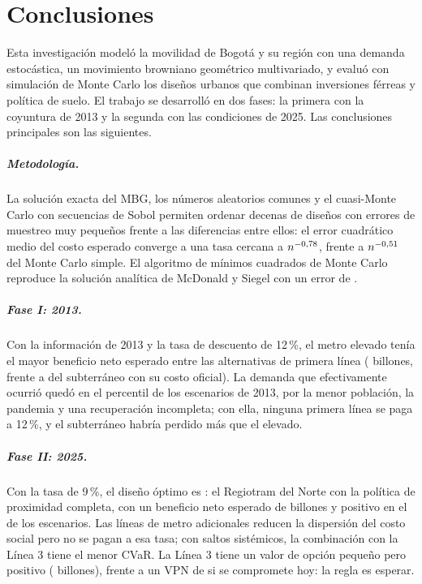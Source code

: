 \chapter{Conclusiones}\label{cap:conclusiones}

Esta investigación modeló la movilidad de Bogotá y su región con una demanda estocástica, un movimiento
browniano geométrico multivariado, y evaluó con simulación de Monte Carlo los diseños urbanos que
combinan inversiones férreas y política de suelo. El trabajo se desarrolló en dos fases: la primera con
la coyuntura de 2013 y la segunda con las condiciones de 2025. Las conclusiones principales son las
siguientes.

\paragraph{Metodología.} La solución exacta del MBG, los números aleatorios comunes y el cuasi-Monte
Carlo con secuencias de Sobol permiten ordenar decenas de diseños con errores de muestreo muy pequeños
frente a las diferencias entre ellos: el error cuadrático medio del costo esperado converge a una tasa
cercana a $n^{-0,78}$, frente a $n^{-0,51}$ del Monte Carlo simple. El algoritmo de
mínimos cuadrados de Monte Carlo reproduce la solución analítica de McDonald y Siegel con un error de
\MSError.

\paragraph{Fase I: 2013.} Con la información de 2013 y la tasa de descuento de 12\,\%, el metro elevado
tenía el mayor beneficio neto esperado entre las alternativas de primera línea (\BNElevDoce{} billones,
frente a \BNSubOfDoce{} del subterráneo con su costo oficial). La demanda que efectivamente ocurrió
quedó en el percentil \PercentilObsFin{} de los escenarios de 2013, por la menor población, la
pandemia y una recuperación incompleta; con ella, ninguna primera línea se paga a 12\,\%, y el
subterráneo habría perdido más que el elevado.

\paragraph{Fase II: 2025.} Con la tasa de 9\,\%, el diseño óptimo es \OptimoNeutral: el Regiotram del
Norte con la política de proximidad completa, con un beneficio neto esperado de \BNOptimo{} billones y
positivo en el \PBNOptimo{} de los escenarios. Las líneas de metro adicionales reducen la dispersión
del costo social pero no se pagan a esa tasa; con saltos sistémicos, la combinación con la Línea 3
tiene el menor CVaR. La Línea 3 tiene un valor de opción pequeño pero positivo (\OpcionFlexible{}
billones), frente a un VPN de \OpcionAhora{} si se compromete hoy: la regla es esperar.

